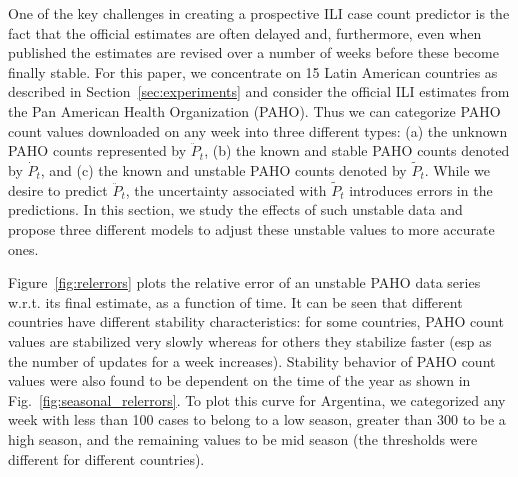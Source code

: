One of the key challenges in creating a prospective ILI case count
predictor is the fact that the official estimates are often 
delayed and, furthermore, even when published the estimates are revised
over a number of weeks before these become finally stable.
For this paper, we concentrate on 15 Latin American countries 
as described in Section~\ref{sec:experiments} and consider the official 
ILI estimates from the Pan American Health Organization (PAHO).%
Thus we can categorize PAHO count values downloaded on any week
into three different types: (a) the unknown
PAHO counts represented  by $\ddot{P}_t$, (b) the known and stable PAHO counts
denoted by $\dot{P}_t$, and (c) the known and unstable PAHO counts denoted by
$\tilde{P}_t$. While we desire to predict $\ddot{P}_t$, the uncertainty associated
with $\tilde{P}_t$ introduces errors in the predictions. In this section, 
we study the effects of such unstable data and propose 
three different models to adjust these unstable
values to more accurate ones.


Figure~\ref{fig:relerrors} plots the relative error of an unstable PAHO data series w.r.t.
its final estimate, as a function of time. It can be seen that different countries 
have different stability characteristics: 
for some countries, PAHO count values are
stabilized very slowly whereas for others they stabilize faster (esp as the number of
updates for a week increases).
Stability behavior of PAHO count values were also found to be dependent on the 
time of the year as shown in Fig.~\ref{fig:seasonal_relerrors}.
To plot this curve for Argentina, we categorized any week with less than 100 cases to belong to a low season,
greater than 300 to be a high season, and the remaining values to be mid season (the thresholds
were different for different countries).

